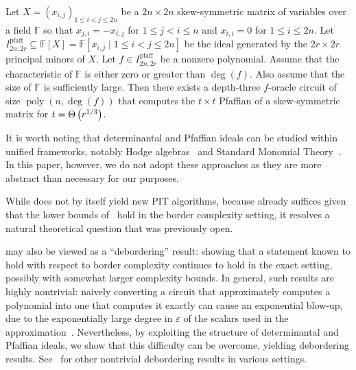 \documentclass[10pt,a4paper]{amsart}
\DeclareMathOperator{\pfaff}{pfaff}
\DeclareMathOperator{\poly}{poly}
\newcommand*\F{\mathbb{F}}
\newcommand*\e{\varepsilon}
\newcommand*\bigTheta[1]{%
    \Theta\kern-0.0pt\left(#1\right)
}
\begin{document}
\begin{thrm}\label{thrm:pfaff_main}
Let $X = (x_{i,j})_{1 \leq i < j \leq 2n}$ be a $2n \times 2n$ skew-symmetric matrix of variables over a field $\F$ so that $x_{j, i} = -x_{i, j}$ for $1 \leq j < i \leq n$ and $x_{i, i} = 0$ for $1 \leq i \leq 2n$.
Let $I^{\pfaff}_{2n, 2r} \subseteq \F[X] = \F[x_{i,j} \mid 1 \leq i < j \leq 2n]$ be the ideal generated by the $2r \times 2r$ principal minors of $X$.  
Let $f \in I^{\pfaff}_{2n, 2r}$ be a nonzero polynomial.  
Assume that the characteristic of $\F$ is either zero or greater than $\deg(f)$.
Also assume that the size of $\F$ is sufficiently large. 
Then there exists a depth-three $f$-oracle circuit of size $\poly(n, \deg(f))$ that computes the $t \times t$ Pfaffian of a skew-symmetric matrix for $t = \bigTheta{r^{1/3}}$.
\end{thrm}

It is worth noting that determinantal and Pfaffian ideals can be studied within unified frameworks, notably Hodge algebras~\cite{DEP82} and Standard Monomial Theory~\cite{LR08,Ses16}.
In this paper, however, we do not adopt these approaches as they are more abstract than necessary for our purposes.

While  does not by itself yield new PIT algorithms, because  already suffices given that the lower bounds of~\cite{LST25} hold in the border complexity setting, it resolves a natural theoretical question that was previously open. 

 may also be viewed as a ``debordering'' result: showing that a statement known to hold with respect to border complexity continues to hold in the exact setting, possibly with somewhat larger complexity bounds.
In general, such results are highly nontrivial: naively converting a circuit that approximately computes a polynomial into one that computes it exactly can cause an exponential blow-up, due to the exponentially large degree in $\e$ of the scalars used in the approximation~\cite{LL89,Bur00}.
Nevertheless, by exploiting the structure of determinantal and Pfaffian ideals, we show that this difficulty can be overcome, yielding debordering results.
See~\cite{DDS22,BDS24,DGIJL24,Shp25} for other nontrivial debordering results in various settings.
\end{document}
